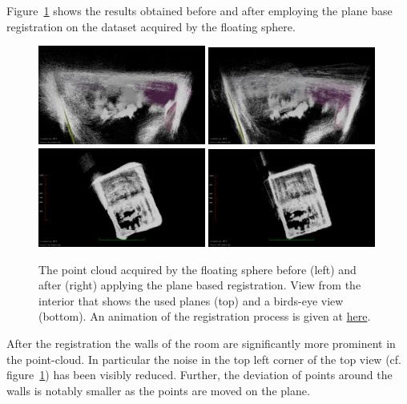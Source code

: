 Figure~\ref{fig:cylon-corrected} shows the results obtained before  and after employing the plane base registration on the dataset acquired by the floating sphere.
\begin{figure}
	\centering
	\includegraphics[width=0.49\textwidth]{./images/cylon_uncorr_corner}\hfill
	\includegraphics[width=0.49\textwidth]{./images/cylon_corr_corner}\\
	\includegraphics[width=0.49\textwidth]{./images/cylon_uncorr_top}\hfill
	\includegraphics[width=0.49\textwidth]{./images/cylon_corr_top}
	\caption{The point cloud acquired by the floating sphere before (left) and after (right) applying the plane based registration. View from the interior that shows the used planes (top) and a birds-eye view (bottom). An animation of the registration process is given at \href{https://youtu.be/8XdIUN_9VpY}{here}.}
	\label{fig:cylon-corrected}
\end{figure}
After the registration the walls of the room are significantly more prominent in the point-cloud. 
In particular the noise in the top left corner of the top view (cf. figure~\ref{fig:cylon-corrected}) has been visibly reduced.
Further, the deviation of points around the walls is notably smaller as the points are moved on the plane.

